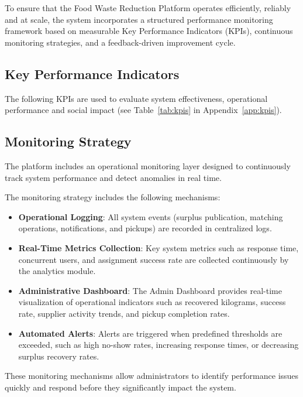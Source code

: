 \documentclass[conference]{IEEEtran}
\begin{document}
To ensure that the Food Waste Reduction Platform operates efficiently, reliably and at scale, the system incorporates a structured performance monitoring framework based on measurable Key Performance Indicators (KPIs), continuous monitoring strategies, and a feedback-driven improvement cycle.

\subsection{Key Performance Indicators}

The following KPIs are used to evaluate system effectiveness, operational
performance and social impact (see Table~\ref{tab:kpis} in Appendix~\ref{app:kpis}).

\subsection{Monitoring Strategy}

The platform includes an operational monitoring layer designed to continuously track system performance and detect anomalies in real time.

The monitoring strategy includes the following mechanisms:

\begin{itemize}
    \item \textbf{Operational Logging}: All system events (surplus publication, matching operations, notifications, and pickups) are recorded in centralized logs.
    
    \item \textbf{Real-Time Metrics Collection}: Key system metrics such as response time, concurrent users, and assignment success rate are collected continuously by the analytics module.
    
    \item \textbf{Administrative Dashboard}: The Admin Dashboard provides real-time visualization of operational indicators such as recovered kilograms, success rate, supplier activity trends, and pickup completion rates.
    
    \item \textbf{Automated Alerts}: Alerts are triggered when predefined thresholds are exceeded, such as high no-show rates, increasing response times, or decreasing surplus recovery rates.
\end{itemize}

These monitoring mechanisms allow administrators to identify performance issues quickly and respond before they significantly impact the system.
\end{document}
